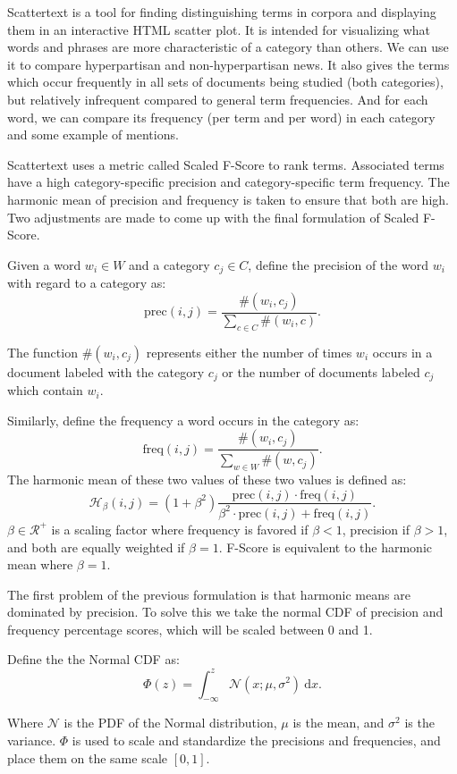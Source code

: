 \documentclass[11pt,a4paper]{article}
\begin{document}
Scattertext \cite{kessler2017scattertext} is a tool for finding distinguishing terms in corpora and displaying them in an interactive HTML scatter plot. It is intended for visualizing what words and phrases are more characteristic of a category than others. We can use it to compare hyperpartisan and non-hyperpartisan news. It also gives the terms which occur frequently in all sets of documents being studied (both categories), but relatively infrequent compared to general term frequencies. And for each word, we can compare its frequency (per term and per word) in each category and some example of mentions.

Scattertext uses a metric called Scaled F-Score to rank terms. Associated terms have a high category-specific precision and category-specific term frequency. The harmonic mean of precision and frequency is taken to ensure that both are high. Two adjustments are made to come up with the final formulation of Scaled F-Score.

Given a word $w_i \in W$ and a category $c_j \in C$, define the precision of the word $w_i$ with regard to a category as:
$$ \mbox{prec}(i,j) = \frac{\#(w_i, c_j)}{\sum_{c \in C} \#(w_i, c)}. $$

The function $\#(w_i, c_j)$ represents either the number of times $w_i$ occurs in a document labeled with the category $c_j$ or the number of documents labeled $c_j$ which contain $w_i$.

Similarly, define the frequency a word occurs in the category as:
$$ \mbox{freq}(i, j) = \frac{\#(w_i, c_j)}{\sum_{w \in W} \#(w, c_j)}. $$
The harmonic mean of these two values of these two values is defined as:
$$ \mathcal{H}_\beta(i,j) = (1 + \beta^2) \frac{\mbox{prec}(i,j) \cdot \mbox{freq}(i,j)}{\beta^2 \cdot \mbox{prec}(i,j) + \mbox{freq}(i,j)}. $$
$\beta \in \mathcal{R}^+$ is a scaling factor where frequency is favored if $\beta < 1$, precision if $\beta > 1$, and both are equally weighted if $\beta = 1$. F-Score is equivalent to the harmonic mean where $\beta = 1$.

The first problem of the previous formulation is that harmonic means are dominated by precision. To solve this we take the normal CDF of precision and frequency percentage scores, which will be scaled between 0 and 1.

Define the the Normal CDF as:
$$ \Phi(z) = \int_{-\infty}^z \mathcal{N}(x; \mu, \sigma^2)\ \mathrm{d}x.$$

Where $ \mathcal{N} $ is the PDF of the Normal distribution, $\mu$ is the mean, and $\sigma^2$ is the variance. $\Phi$ is used to scale and standardize the precisions and frequencies, and place them on the same scale $[0,1]$.
\end{document}
